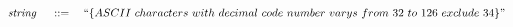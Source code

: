 \[
	~\emph{string}~ \quad ::= \quad
		``\{ASCII~characters~with~decimal~code~number~varys~from~32~to~126~exclude~34\}"
\]